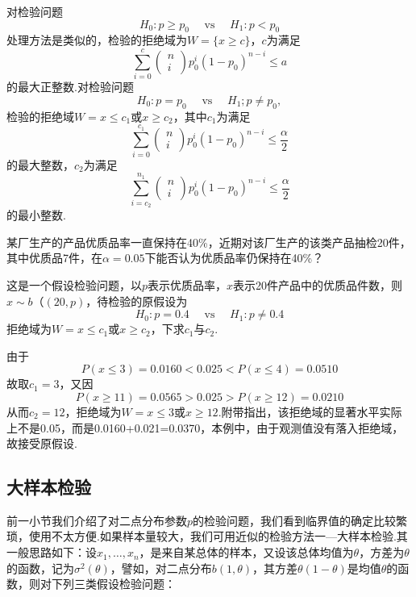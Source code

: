 对检验问题
\begin{equation}\label{eq7.3.10}
H _ { 0 } : p \geq p _ { 0 } \quad \text { vs } \quad H _ { 1 } : p < p _ { 0 }
\end{equation}
处理方法是类似的，检验的拒绝域为$W=\{x\geq c\}$，$c$为满足
\[\sum _ { i = 0 } ^ { c } \left( \begin{array} { l } { n } \\ { i } \end{array} \right) p _ { 0 } ^ { i } \left( 1 - p _ { 0 } \right) ^ { n - i } \leq a\]
的最大正整数.对检验问题
\begin{equation}\label{eq7.3.11}
H _ { 0 } : p = p _ { 0 } \quad \text { vs } \quad H _ { 1 } ; p \neq p _ { 0 },
\end{equation}
检验的拒绝域$W={x\leq c_{1}\text{或}x\geq c_{2}}$，其中$c_{1}$为满足
\[\sum _ { i = 0 } ^ { c _ { 1 } } \left( \begin{array} { l } { n } \\ { i } \end{array} \right) p _ { 0 } ^ { i } \left( 1 - p _ { 0 } \right) ^ { n - i } \leq \frac { \alpha } { 2 }\]
的最大整数，$c_{2}$为满足
\[\sum _ { i = c _ { 2 } } ^ { n _ { 1 } } \left( \begin{array} { l } { n } \\ { i } \end{array} \right) p _ { 0 } ^ { i } \left( 1 - p _ { 0 } \right) ^ { n - i } \leq \frac { \alpha } { 2 }\]
的最小整数.
\begin{example}\label{exam7.3.2}
	某厂生产的产品优质品率一直保持在40\%，近期对该厂生产的该类产品抽检20件，其中优质品7件，在$\alpha=0.05$下能否认为优质品率仍保持在40\%？
	
	这是一个假设检验问题，以$p$表示优质品率，$x$表示20件产品中的优质品件数，则$x\sim b（(20,p)$，待检验的原假设为
	\[H _ { 0 } : p = 0.4 \quad \text { vs } \quad H _ { 1 } : p \neq 0.4\]
	拒绝域为$W={x\leq c_{1}\text{或}x\geq c_{2}}$，下求$c_{1}$与$c_{2}$.
		
	由于
	\[P ( x \leq 3 ) = 0.0160 < 0.025 < P ( x \leq 4 ) = 0.0510\]
	故取$c_{1}=3$，又因
	\[P ( x \geq 11 ) = 0.0565 > 0.025 > P ( x \geq 12 ) = 0.0210\]
	从而$c_{2}=12$，拒绝域为$W={x\leq 3\text{或}x\geq 12}$.附带指出，该拒绝域的显著水平实际上不是0.05，而是0.0160+0.021=0.0370，本例中，由于观测值没有落入拒绝域，故接受原假设.
\end{example}

\subsection{大样本检验\label{sec:7.3.3}}
前一小节我们介绍了对二点分布参数$p$的检验问题，我们看到临界值的确定比较繁琐，使用不太方便.如果样本量较大，我们可用近似的检验方法一—大样本检验.其一般思路如下：设$x_{1},\dotsc,x_{n}$，是来自某总体的样本，又设该总体均值为$\theta$，方差为$\theta$的函数，记为$\sigma^{2}(\theta)$，譬如，对二点分布$b(1,\theta)$，其方差$\theta(1-\theta)$是均值$\theta$的函数，则对下列三类假设检验问题：

